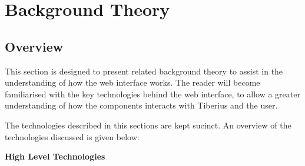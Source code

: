 \section{Background Theory}

\subsection{Overview}
This section is designed to present related background theory to assist in the
understanding of how the web interface works. The reader will become
familiarised with the key technologies behind the web interface, to allow a
greater understanding of how the components interacts with Tiberius and the
user.

The technologies described in this sections are kept sucinct. An overview of
the technologies discussed is given below:

\textbf{High Level Technologies}

